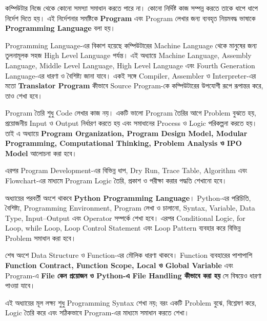 
\begin{overviewbox}

কম্পিউটার নিজে থেকে কোনো সমস্যা সমাধান করতে পারে না।
কোনো নির্দিষ্ট কাজ সম্পন্ন করতে তাকে ধাপে ধাপে নির্দেশ দিতে হয়।
এই নির্দেশনার সমষ্টিকে \textbf{Program} এবং Program লেখার জন্য
ব্যবহৃত নিয়মবদ্ধ ভাষাকে \textbf{Programming Language} বলা হয়।

Programming Language-এর বিকাশ হয়েছে কম্পিউটারের
Machine Language থেকে মানুষের জন্য তুলনামূলক সহজ
High Level Language পর্যন্ত। এই অধ্যায়ে Machine Language,
Assembly Language, Middle Level Language, High Level Language
এবং Fourth Generation Language-এর ধারণা ও বৈশিষ্ট্য জানা যাবে।
একই সঙ্গে Compiler, Assembler ও Interpreter-এর মতো
\textbf{Translator Program} কীভাবে Source Program-কে
কম্পিউটারের উপযোগী রূপে রূপান্তর করে, তাও শেখা হবে।

Program তৈরি শুধু Code লেখার কাজ নয়। একটি ভালো Program তৈরির আগে
Problem বুঝতে হয়, প্রয়োজনীয় Input ও Output নির্ধারণ করতে হয় এবং
সমাধানের Process ও Logic পরিকল্পনা করতে হয়। তাই এ অধ্যায়ে
\textbf{Program Organization, Program Design Model, Modular Programming,
Computational Thinking, Problem Analysis ও IPO Model} আলোচনা করা হবে।

এরপর Program Development-এর বিভিন্ন ধাপ, Dry Run, Trace Table,
Algorithm এবং Flowchart-এর মাধ্যমে Program Logic তৈরি, প্রকাশ ও
পরীক্ষা করার পদ্ধতি শেখানো হবে।

অধ্যায়ের পরবর্তী অংশে থাকবে \textbf{Python Programming Language}।
Python-এর পরিচিতি, বৈশিষ্ট্য, Programming Environment, Program লেখা
ও চালানো, Syntax, Variable, Data Type, Input--Output এবং Operator
সম্পর্কে শেখা হবে। এরপর Conditional Logic,
\textenglish{\ttfamily for} Loop,
\textenglish{\ttfamily while} Loop,
Loop Control Statement এবং Loop Pattern ব্যবহার করে বিভিন্ন
Problem সমাধান করা হবে।

শেষ অংশে Data Structure ও Function-এর মৌলিক ধারণা থাকবে।
Function ব্যবহারের পাশাপাশি \textbf{Function Contract, Function Scope,
Local ও Global Variable} এবং Program-এ \textbf{File কেন প্রয়োজন ও Python-এ
File Handling কীভাবে করা হয়} সে বিষয়েও ধারণা পাওয়া যাবে।

এই অধ্যায়ের মূল লক্ষ্য শুধু Programming Syntax শেখা নয়;
বরং একটি Problem বুঝে, বিশ্লেষণ করে, Logic তৈরি করে এবং
সঠিকভাবে Program-এর মাধ্যমে সমাধান করতে শেখা।

\end{overviewbox}

